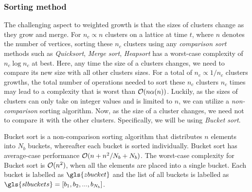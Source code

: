 \subsubsection{Sorting method}

The challenging aspect to weighted growth is that the sizes of clusters change as they grow and merge. For $n_c\propto n$ clusters on a lattice at time $t$, where $n$ denotes the number of vertices, sorting these $n_c$ clusters using any \emph{comparison sort} methods such as \emph{Quicksort}, \emph{Merge sort}, \emph{Heapsort} has a worst-case complexity of $n_c \log n_c$ at best. Here, any time the size of a clusters changes, we need to compare its new size with all other clusters sizes. For a total of $n_c \propto 1/n_c$ clusters growths, the total number of operations needed to sort these $n_c$ clusters $n_c$ times may lead to a complexity that is worst than $\mathcal{O}(n\alpha(n))$. Luckily, as the sizes of clusters can only take on integer values and is limited to $n$, we can utilize a \emph{non-comparison} sorting algorithm. Now, as the size of a cluster changes, we need not to compare it with the other clusters. Specifically, we will be using \emph{Bucket sort}. 
\begin{definition}\label{def:buckets}
  Bucket sort is a non-comparison sorting algorithm that distributes $n$ elements into $N_b$ buckets, whereafter each bucket is sorted individually. Bucket sort has average-case performance $\mathcal{O}(n + n^2/N_b + N_b)$. The worst-case complexity for Bucket sort is $\mathcal{O}(n^2)$, when all the elements are placed into a single bucket. Each bucket is labelled as $\gls{zbucket}$ and the list of all buckets is labelled as $\gls{slbuckets}=[b_1, b_2, ...,b_{N_b}]$. 
\end{definition}
